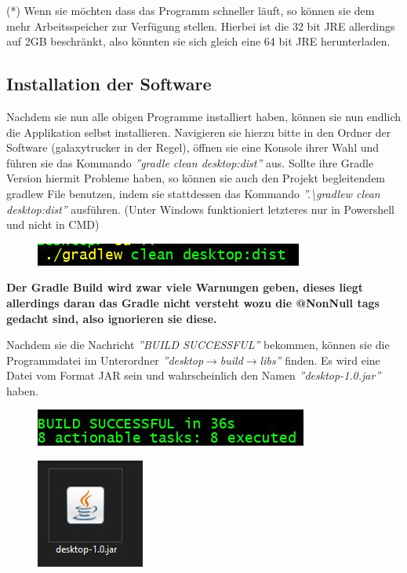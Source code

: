 \documentclass[fontsize=12pt,paper=a4,twoside]{scrartcl}
\begin{document}
(*) Wenn sie möchten dass das Programm schneller läuft, so können sie dem mehr Arbeitsspeicher zur Verfügung stellen. Hierbei ist die 32 bit JRE allerdings auf 2GB beschränkt, also könnten sie sich gleich eine 64 bit JRE herunterladen.


\subsection{Installation der Software}

Nachdem sie nun alle obigen Programme installiert haben, können sie nun endlich die Applikation selbst installieren. Navigieren sie hierzu bitte in den Ordner der Software (galaxytrucker in der Regel), öffnen sie eine Konsole ihrer Wahl und führen sie das Kommando \textit{''gradle clean desktop:dist''} aus. Sollte ihre Gradle Version hiermit Probleme haben, so können sie auch den Projekt begleitendem gradlew File benutzen, indem sie stattdessen das Kommando \textit{''.\textbackslash gradlew clean desktop:dist''} ausführen. (Unter Windows funktioniert letzteres nur in Powershell und nicht in CMD)  
\begin{figure}[h!]
\centering
\includegraphics[width=0.5\linewidth]{command.JPG}
\end{figure} 
\textbf{Der Gradle Build wird zwar viele Warnungen geben, dieses liegt allerdings daran das Gradle nicht versteht wozu die @NonNull tags gedacht sind, also ignorieren sie diese.}

Nachdem sie die Nachricht \textit{''BUILD SUCCESSFUL''} bekommen, können sie die Programmdatei im Unterordner \textit{''desktop$\rightarrow$build$\rightarrow$libs''} finden. Es wird eine Datei vom Format JAR sein und wahrscheinlich den Namen \textit{''desktop-1.0.jar''} haben.

\begin{figure}[h!]
\centering
\includegraphics[width=0.5\linewidth]{gradle_build.JPG}
\end{figure} 

\begin{figure}[h!]
\centering
\includegraphics[width=0.5\linewidth]{application.JPG}
\end{figure} 
\end{document}
